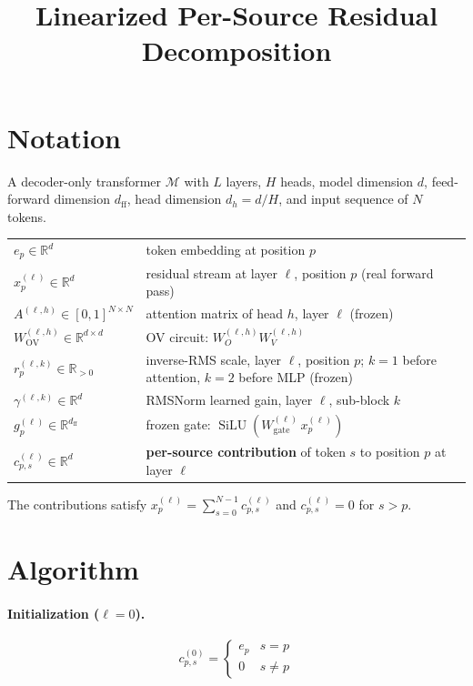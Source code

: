 \documentclass[11pt]{article}
\title{Linearized Per-Source Residual Decomposition}
\date{}
\begin{document}
\maketitle

\section{Notation}

A decoder-only transformer $\mathcal{M}$ with $L$ layers, $H$ heads, model
dimension $d$, feed-forward dimension $d_{\mathrm{ff}}$, head dimension
$d_h = d/H$, and input sequence of $N$ tokens.

\medskip
\begin{tabular}{ll}
$e_p \in \mathbb{R}^d$                & token embedding at position $p$ \\
$x^{(\ell)}_p \in \mathbb{R}^d$      & residual stream at layer $\ell$, position $p$ (real forward pass) \\
$A^{(\ell,h)} \in [0,1]^{N\times N}$ & attention matrix of head $h$, layer $\ell$ (frozen) \\
$W^{(\ell,h)}_{\mathrm{OV}} \in \mathbb{R}^{d\times d}$ & OV circuit: $W^{(\ell,h)}_O W^{(\ell,h)}_V$ \\
$r^{(\ell,k)}_p \in \mathbb{R}_{>0}$ & inverse-RMS scale, layer $\ell$, position $p$; $k{=}1$ before attention, $k{=}2$ before MLP (frozen) \\
$\gamma^{(\ell,k)} \in \mathbb{R}^d$ & RMSNorm learned gain, layer $\ell$, sub-block $k$ \\
$g^{(\ell)}_p \in \mathbb{R}^{d_{\mathrm{ff}}}$ & frozen gate: $\operatorname{SiLU}(W^{(\ell)}_{\mathrm{gate}}\, x^{(\ell)}_p)$ \\
$c^{(\ell)}_{p,s} \in \mathbb{R}^d$  & \textbf{per-source contribution} of token $s$ to position $p$ at layer $\ell$
\end{tabular}

\medskip
The contributions satisfy $\displaystyle x^{(\ell)}_p = \sum_{s=0}^{N-1} c^{(\ell)}_{p,s}$
and $c^{(\ell)}_{p,s} = 0$ for $s > p$.

\section{Algorithm}

\paragraph{Initialization ($\ell = 0$).}
\begin{equation}
    c^{(0)}_{p,s} =
    \begin{cases} e_p & s = p \\ 0 & s \neq p \end{cases}
\end{equation}
\end{document}
